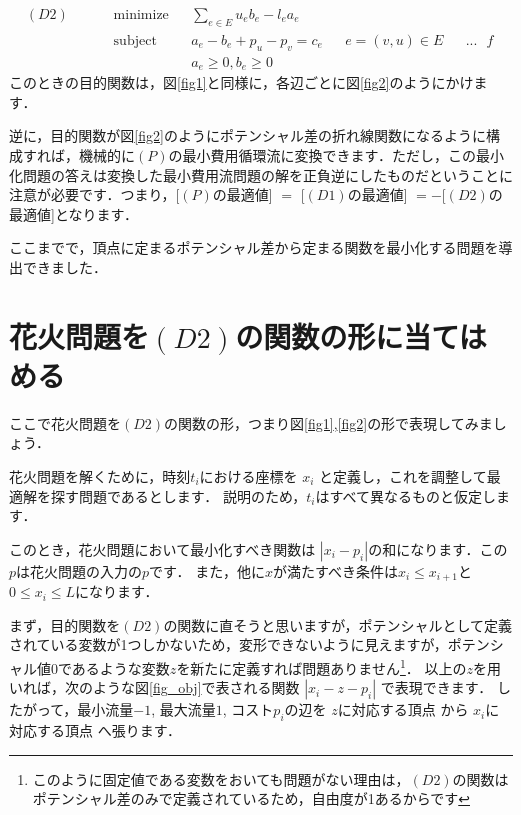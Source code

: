 \documentclass[13pt]{jarticle}
\theoremstyle{nonitalic} %
\begin{document}
\begin{align}
&(D2)&&&&\textrm{minimize}   && \sum_{e\in E} u_e b_e - l_e a_e  \\
&&&&&\textrm{subject to} && a_e - b_e + p_u - p_v = c_e && e = (v,u) \in E  && \textrm{...主変数$f$}& \\
&&&&& && a_e \geq 0, b_e \geq 0 &&&&&&&&
\end{align}
このときの目的関数は，図\ref{fig1}と同様に，各辺ごとに図\ref{fig2}のようにかけます．

逆に，目的関数が図\ref{fig2}のようにポテンシャル差の折れ線関数になるように構成すれば，機械的に$(P)$の最小費用循環流に変換できます．ただし，この最小化問題の答えは変換した最小費用流問題の解を正負逆にしたものだということに注意が必要です．つまり，[$(P)$の最適値] $=$ [$(D1)$の最適値] $=  -$[$(D2)$の最適値]となります．

ここまでで，頂点に定まるポテンシャル差から定まる関数を最小化する問題を導出できました．

\section{花火問題を$(D2)$の関数の形に当てはめる}
ここで花火問題を$(D2)$の関数の形，つまり図\ref{fig1},\ref{fig2}の形で表現してみましょう．

花火問題を解くために，時刻$t_i$における座標を $x_i$ と定義し，これを調整して最適解を探す問題であるとします．
説明のため，$t_i$はすべて異なるものと仮定します．

このとき，花火問題において最小化すべき関数は
$|x_i - p_i|$の和になります．この$p$は花火問題の入力の$p$です．
また，他に$x$が満たすべき条件は$x_i \leq x_{i+1}$と$0 \leq x_i \leq L$になります．

まず，目的関数を$(D2)$の関数に直そうと思いますが，ポテンシャルとして定義されている変数が1つしかないため，変形できないように見えますが，ポテンシャル値0であるような変数$z$を新たに定義すれば問題ありません\footnote{このように固定値である変数をおいても問題がない理由は，$(D2)$の関数はポテンシャル差のみで定義されているため，自由度が1あるからです}．
以上の$z$を用いれば，次のような図\ref{fig_obj}で表される関数 $|x_i - z - p_i|$ で表現できます．
したがって，最小流量$-1$, 最大流量$1$, コスト$p_i$の辺を $z$に対応する頂点 から $x_i$に対応する頂点 へ張ります．
\end{document}
